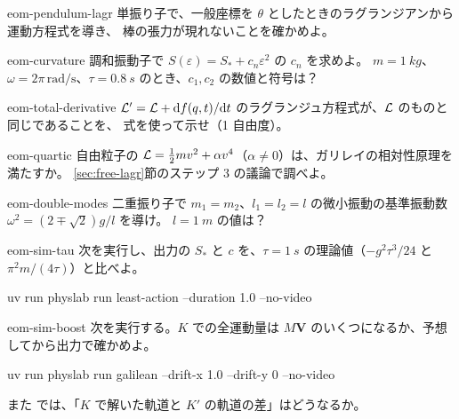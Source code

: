 \begin{exercise}[基礎]{eom-pendulum-lagr}
単振り子で、一般座標を $\theta$ としたときのラグランジアンから運動方程式を導き、
棒の張力が現れないことを確かめよ。
\end{exercise}

\begin{exercise}[応用]{eom-curvature}
調和振動子で $S(\varepsilon)=S_*+c_n\varepsilon^2$ の $c_n$ を求めよ。
$m=\qty{1}{kg}$、$\omega=2\pi\,\mathrm{rad/s}$、$\tau=\qty{0.8}{s}$ のとき、$c_1,c_2$ の数値と符号は？
\end{exercise}

\begin{exercise}[応用]{eom-total-derivative}
$\mathcal{L}'=\mathcal{L}+\mathrm{d} f(q,t)/\mathrm{d} t$ のラグランジュ方程式が、$\mathcal{L}$ のものと同じであることを、
式を使って示せ（1 自由度）。
\end{exercise}

\begin{exercise}[応用]{eom-quartic}
自由粒子の $\mathcal{L}=\tfrac12mv^2+\alpha v^4$（$\alpha\ne0$）は、ガリレイの相対性原理を満たすか。
\ref{sec:free-lagr}節のステップ 3 の議論で調べよ。
\end{exercise}

\begin{exercise}[応用]{eom-double-modes}
二重振り子で $m_1=m_2$、$l_1=l_2=l$ の微小振動の基準振動数 $\omega^2=(2\mp\sqrt2)g/l$ を導け。
$l=\qty{1}{m}$ の値は？
\end{exercise}

\begin{exercise}[シミュレーション]{eom-sim-tau}
次を実行し、出力の $S_*$ と $c$ を、$\tau=\qty{1}{s}$ の理論値（$-g^2\tau^3/24$ と $\pi^2m/(4\tau)$）と比べよ。
\begin{terminal}
uv run physlab run least-action --duration 1.0 --no-video
\end{terminal}
\end{exercise}

\begin{exercise}[シミュレーション]{eom-sim-boost}
次を実行する。$K$ での全運動量は $M\bm V$ のいくつになるか、予想してから出力で確かめよ。
\begin{terminal}
uv run physlab run galilean --drift-x 1.0 --drift-y 0 --no-video
\end{terminal}
また  では、「$K$ で解いた軌道と $K'$ の軌道の差」はどうなるか。
\end{exercise}

